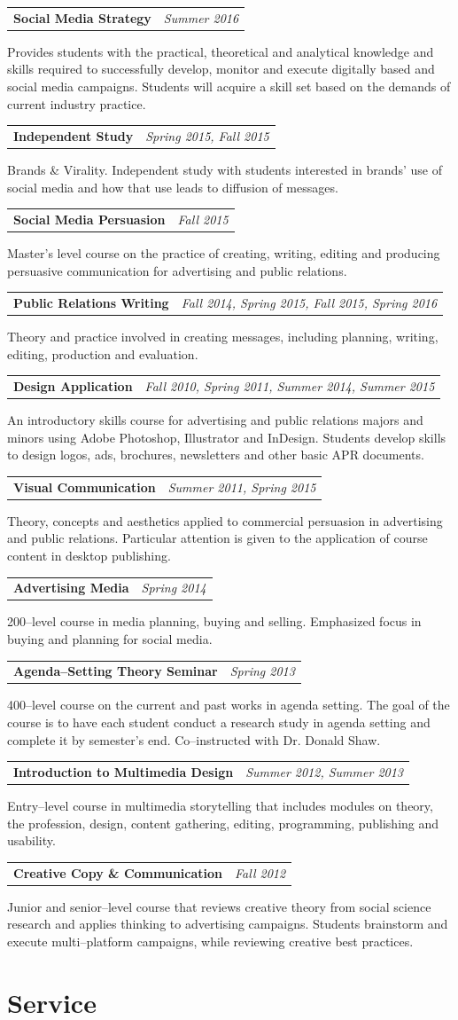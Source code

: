 \documentclass[11pt,letterpaper]{article}
\makeatletter
\newcommand{\cvcourse}[3]{%
  \begin{tabularx}{\textwidth}{@{}X >{\raggedleft\arraybackslash}p{0.33\textwidth}@{}}%
    \textbf{#1} & \textit{#2} \\
  \end{tabularx}\par
  {\small #3}\par
  \vspace{0.35em}
}
\makeatother
\begin{document}
\cvcourse{Social Media Strategy}{Summer 2016}{Provides students with the practical, theoretical and analytical knowledge and skills required to successfully develop, monitor and execute digitally based and social media campaigns. Students will acquire a skill set based on the demands of current industry practice.}
\cvcourse{Independent Study}{Spring 2015, Fall 2015}{Brands \& Virality. Independent study with students interested in brands' use of social media and how that use leads to diffusion of messages.}
\cvcourse{Social Media Persuasion}{Fall 2015}{Master's level course on the practice of creating, writing, editing and producing persuasive communication for advertising and public relations.}
\cvcourse{Public Relations Writing}{Fall 2014, Spring 2015, Fall 2015, Spring 2016}{Theory and practice involved in creating messages, including planning, writing, editing, production and evaluation.}
\cvcourse{Design Application}{Fall 2010, Spring 2011, Summer 2014, Summer 2015}{An introductory skills course for advertising and public relations majors and minors using Adobe Photoshop, Illustrator and InDesign. Students develop skills to design logos, ads, brochures, newsletters and other basic APR documents.}
\cvcourse{Visual Communication}{Summer 2011, Spring 2015}{Theory, concepts and aesthetics applied to commercial persuasion in advertising and public relations. Particular attention is given to the application of course content in desktop publishing.}
\cvcourse{Advertising Media}{Spring 2014}{200--level course in media planning, buying and selling. Emphasized focus in buying and planning for social media.}
\cvcourse{Agenda--Setting Theory Seminar}{Spring 2013}{400--level course on the current and past works in agenda setting. The goal of the course is to have each student conduct a research study in agenda setting and complete it by semester's end. Co--instructed with Dr. Donald Shaw.}
\cvcourse{Introduction to Multimedia Design}{Summer 2012, Summer 2013}{Entry--level course in multimedia storytelling that includes modules on theory, the profession, design, content gathering, editing, programming, publishing and usability.}
\cvcourse{Creative Copy \& Communication}{Fall 2012}{Junior and senior--level course that reviews creative theory from social science research and applies thinking to advertising campaigns. Students brainstorm and execute multi--platform campaigns, while reviewing creative best practices.}
\section{Service}
\end{document}
